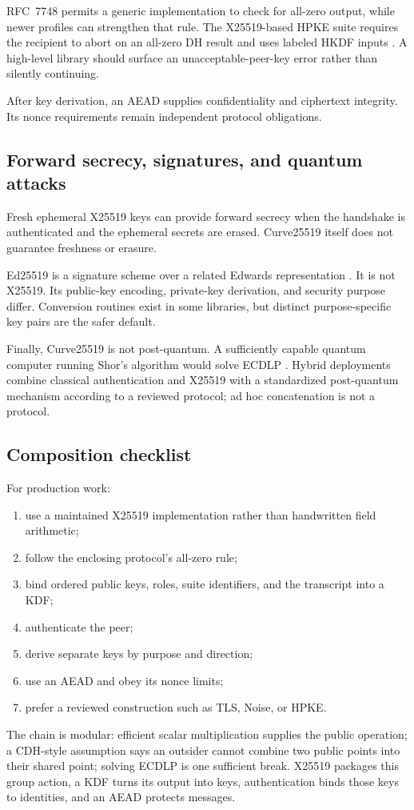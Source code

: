 RFC~7748 permits a generic implementation to check for all-zero output, while
newer profiles can strengthen that rule. The X25519-based HPKE suite requires
the recipient to abort on an all-zero DH result and uses labeled HKDF inputs
\cite{rfc9180}. A high-level library should surface an unacceptable-peer-key
error rather than silently continuing.

After key derivation, an AEAD supplies confidentiality and ciphertext
integrity. Its nonce requirements remain independent protocol obligations.

\subsection{Forward secrecy, signatures, and quantum attacks}

Fresh ephemeral X25519 keys can provide forward secrecy when the handshake is
authenticated and the ephemeral secrets are erased. Curve25519 itself does not
guarantee freshness or erasure.

Ed25519 is a signature scheme over a related Edwards representation
\cite{rfc8032}. It is not X25519. Its public-key encoding, private-key
derivation, and security purpose differ. Conversion routines exist in some
libraries, but distinct purpose-specific key pairs are the safer default.

Finally, Curve25519 is not post-quantum. A sufficiently capable quantum
computer running Shor's algorithm would solve ECDLP \cite{shor1997}. Hybrid
deployments combine classical authentication and X25519 with a standardized
post-quantum mechanism according to a reviewed protocol; ad hoc concatenation
is not a protocol.

\subsection{Composition checklist}

For production work:
\begin{enumerate}
  \item use a maintained X25519 implementation rather than handwritten field
        arithmetic;
  \item follow the enclosing protocol's all-zero rule;
  \item bind ordered public keys, roles, suite identifiers, and the transcript
        into a KDF;
  \item authenticate the peer;
  \item derive separate keys by purpose and direction;
  \item use an AEAD and obey its nonce limits;
  \item prefer a reviewed construction such as TLS, Noise, or HPKE.
\end{enumerate}

\begin{takeaway}
The chain is modular: efficient scalar multiplication supplies the public
operation; a CDH-style assumption says an outsider cannot combine two public
points into their shared point; solving ECDLP is one sufficient break. X25519
packages this group action, a KDF turns its output into keys, authentication
binds those keys to identities, and an AEAD protects messages.
\end{takeaway}
